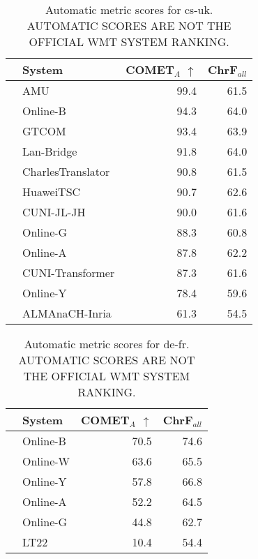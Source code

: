 \begin{table}
\centering
\caption{Automatic metric scores for cs-uk. \\AUTOMATIC SCORES ARE NOT THE OFFICIAL WMT SYSTEM RANKING.}
\begin{tabular}{llrr}
\toprule
          &             System &  COMET$_{A}$ $\uparrow$ &  ChrF$_{all}$ \\
\midrule
 \Const{} &                AMU &                    99.4 &          61.5 \\
 \Uncon{} &           Online-B &                    94.3 &          64.0 \\
 \Uncon{} &              GTCOM &                    93.4 &          63.9 \\
 \Uncon{} &         Lan-Bridge &                    91.8 &          64.0 \\
 \Uncon{} &  CharlesTranslator &                    90.8 &          61.5 \\
 \Const{} &          HuaweiTSC &                    90.7 &          62.6 \\
 \Const{} &         CUNI-JL-JH &                    90.0 &          61.6 \\
 \Uncon{} &           Online-G &                    88.3 &          60.8 \\
 \Uncon{} &           Online-A &                    87.8 &          62.2 \\
 \Const{} &   CUNI-Transformer &                    87.3 &          61.6 \\
 \Uncon{} &           Online-Y &                    78.4 &          59.6 \\
 \Const{} &     ALMAnaCH-Inria &                    61.3 &          54.5 \\
\bottomrule
\end{tabular}
\end{table}



\begin{table}
\centering
\caption{Automatic metric scores for de-fr. \\AUTOMATIC SCORES ARE NOT THE OFFICIAL WMT SYSTEM RANKING.}
\begin{tabular}{llrr}
\toprule
          &    System &  COMET$_{A}$ $\uparrow$ &  ChrF$_{all}$ \\
\midrule
 \Uncon{} &  Online-B &                    70.5 &          74.6 \\
 \Uncon{} &  Online-W &                    63.6 &          65.5 \\
 \Uncon{} &  Online-Y &                    57.8 &          66.8 \\
 \Uncon{} &  Online-A &                    52.2 &          64.5 \\
 \Uncon{} &  Online-G &                    44.8 &          62.7 \\
 \Const{} &      LT22 &                    10.4 &          54.4 \\
\bottomrule
\end{tabular}
\end{table}



